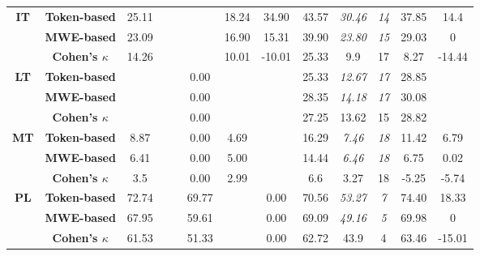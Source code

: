 \documentclass[output=paper
,modfonts
,nonflat,draftmode]{langsci/langscibook}
\begin{document}
\begin{table}
{\begin{tabular}{ccccccccccccc}
\textbf{\scriptsize{}IT} & \textbf{\scriptsize{}Token-based} & {\scriptsize{}25.11} &  &  &  & {\scriptsize{}18.24} & {\scriptsize{}34.90} & {\scriptsize{}43.57} & \emph{\scriptsize{}30.46} & \textit{\scriptsize{}14} & {\scriptsize{}37.85} & {\scriptsize{}14.4}\tabularnewline
 & \textbf{\scriptsize{}MWE-based} & {\scriptsize{}23.09} &  &  &  & {\scriptsize{}16.90} & {\scriptsize{}15.31} & {\scriptsize{}39.90} & \emph{\scriptsize{}23.80} & \textit{\scriptsize{}15} & {\scriptsize{}29.03} & {\scriptsize{}0}\tabularnewline
   & \textbf{\scriptsize{}Cohen's $\kappa$} &\scriptsize{14.26}  &\scriptsize{}  &\scriptsize{}  & \scriptsize{} &\scriptsize{10.01}  &\scriptsize{-10.01}  &\scriptsize{25.33} &\scriptsize{9.9}  &\scriptsize{17} & \scriptsize{8.27} &\scriptsize{-14.44}  \tabularnewline
\midrule 

\textbf{\scriptsize{}LT} & \textbf{\scriptsize{}Token-based} &  &  &  & {\scriptsize{}0.00} &  &  & {\scriptsize{}25.33} & \emph{\scriptsize{}12.67} & \textit{\scriptsize{}17} & {\scriptsize{}28.85} & \tabularnewline
 & \textbf{\scriptsize{}MWE-based} &  &  &  & {\scriptsize{}0.00} &  &  & {\scriptsize{}28.35} & \emph{\scriptsize{}14.18} & \textit{\scriptsize{}17} & {\scriptsize{}30.08} & \tabularnewline
   & \textbf{\scriptsize{}Cohen's $\kappa$} &\scriptsize{}  &\scriptsize{}  &\scriptsize{}  & \scriptsize{0.00} &\scriptsize{}  &\scriptsize{}  &\scriptsize{27.25} &\scriptsize{13.62}  &\scriptsize{15} & \scriptsize{28.82} &\scriptsize{}  \tabularnewline
\midrule 

\textbf{\scriptsize{}MT} & \textbf{\scriptsize{}Token-based} & {\scriptsize{}8.87} &  &  & {\scriptsize{}0.00} & {\scriptsize{}4.69} &  & {\scriptsize{}16.29} & \emph{\scriptsize{}7.46} & \textit{\scriptsize{}18} & {\scriptsize{}11.42} & {\scriptsize{}6.79}\tabularnewline
 & \textbf{\scriptsize{}MWE-based} & {\scriptsize{}6.41} &  &  & {\scriptsize{}0.00} & {\scriptsize{}5.00} &  & {\scriptsize{}14.44} & \emph{\scriptsize{}6.46} & \textit{\scriptsize{}18} & {\scriptsize{}6.75} & {\scriptsize{}0.02}\tabularnewline
   & \textbf{\scriptsize{}Cohen's $\kappa$} &\scriptsize{3.5}  &\scriptsize{}  &\scriptsize{}  & \scriptsize{0.00} &\scriptsize{2.99}  &\scriptsize{}  &\scriptsize{6.6} &\scriptsize{3.27}  &\scriptsize{18} & \scriptsize{-5.25} &\scriptsize{-5.74}  \tabularnewline
\midrule 

\textbf{\scriptsize{}PL} & \textbf{\scriptsize{}Token-based} & {\scriptsize{}72.74} &  &  & {\scriptsize{}69.77} &  & {\scriptsize{}0.00} & {\scriptsize{}70.56} & \emph{\scriptsize{}53.27} & \textit{\scriptsize{}7} & {\scriptsize{}74.40} & {\scriptsize{}18.33}\tabularnewline
 & \textbf{\scriptsize{}MWE-based} & {\scriptsize{}67.95} &  &  & {\scriptsize{}59.61} &  & {\scriptsize{}0.00} & {\scriptsize{}69.09} & \emph{\scriptsize{}49.16} & \textit{\scriptsize{}5} & {\scriptsize{}69.98} & {\scriptsize{}0}\tabularnewline
   & \textbf{\scriptsize{}Cohen's $\kappa$} &\scriptsize{61.53}  &\scriptsize{}  &\scriptsize{}  & \scriptsize{51.33} &\scriptsize{}  &\scriptsize{0.00}  &\scriptsize{62.72} &\scriptsize{43.9}  &\scriptsize{4} & \scriptsize{63.46} &\scriptsize{-15.01} \tabularnewline
\midrule 


\end{tabular}}
\end{table}
\end{document}
